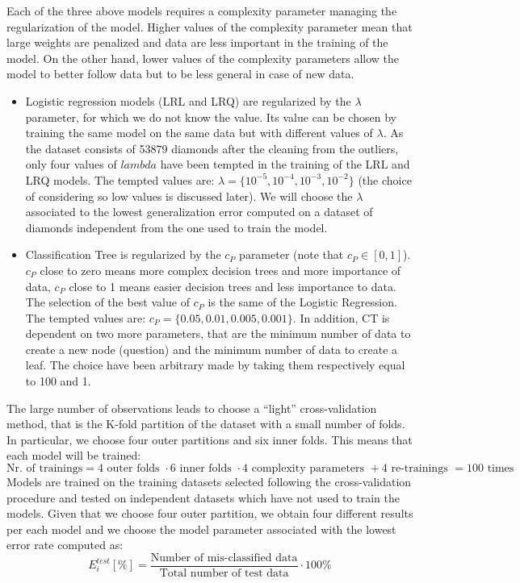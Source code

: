 \documentclass[
]{article}
\providecommand{\tightlist}{%
  \setlength{\itemsep}{0pt}\setlength{\parskip}{0pt}}
\begin{document}
Each of the three above models requires a complexity parameter managing
the regularization of the model. Higher values of the complexity
parameter mean that large weights are penalized and data are less
important in the training of the model. On the other hand, lower values
of the complexity parameters allow the model to better follow data but
to be less general in case of new data.

\begin{itemize}
\tightlist
\item
  Logistic regression models (LRL and LRQ) are regularized by the
  \(\lambda\) parameter, for which we do not know the value. Its value
  can be chosen by training the same model on the same data but with
  different values of \(\lambda\). As the dataset consists of 53879
  diamonds after the cleaning from the outliers, only four values of
  \(lambda\) have been tempted in the training of the LRL and LRQ
  models. The tempted values are:
  \(\lambda=\{10^{-5},10^{-4},10^{-3},10^{-2}\}\) (the choice of
  considering so low values is discussed later). We will choose the
  \(\lambda\) associated to the lowest generalization error computed on
  a dataset of diamonds independent from the one used to train the
  model.
\item
  Classification Tree is regularized by the \(c_P\) parameter (note that
  \(c_P\in[0,1]\)). \(c_P\) close to zero means more complex decision
  trees and more importance of data, \(c_P\) close to 1 means easier
  decision trees and less importance to data. The selection of the best
  value of \(c_P\) is the same of the Logistic Regression. The tempted
  values are: \(c_P=\{0.05,0.01,0.005,0.001\}\). In addition, CT is
  dependent on two more parameters, that are the minimum number of data
  to create a new node (question) and the minimum number of data to
  create a leaf. The choice have been arbitrary made by taking them
  respectively equal to 100 and 1.
\end{itemize}

The large number of observations leads to choose a ``light''
cross-validation method, that is the K-fold partition of the dataset
with a small number of folds. In particular, we choose four outer
partitions and six inner folds. This means that each model will be
trained: \[
\text{Nr. of trainings} = 4 \text{ outer folds } \cdot 6 \text{ inner folds } \cdot 4 \text{ complexity parameters } + 4 \text{ re-trainings } = 100 \text{ times}
\] Models are trained on the training datasets selected following the
cross-validation procedure and tested on independent datasets which have
not used to train the models. Given that we choose four outer partition,
we obtain four different results per each model and we choose the model
parameter associated with the lowest error rate computed as: \[
E_i^{test} [\%] = \frac{\text{Number of mis-classified data}}{\text{Total number of test data}} \cdot 100 \%
\]
\end{document}

